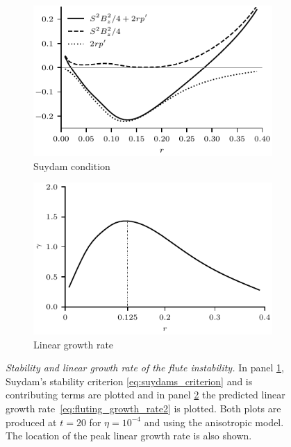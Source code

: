\documentclass[fleqn,usenatbib]{mnras}
\newcommand{\mycaption}[2]{\caption[#1]{\emph{#1} #2}}
\begin{document}
\begin{figure}
  \centering
    \begin{subfigure}{0.49\textwidth}
      \includegraphics[width=\linewidth]{suydam_condition_4.pdf}
      \caption{Suydam condition}
      \label{fig:suydam_condition_4}
    \end{subfigure}
    \hfill
    \begin{subfigure}{0.49\textwidth}
      \includegraphics[width=\linewidth]{growth_rate_4.pdf}
      \caption{Linear growth rate}
      \label{fig:growth_rate_4}
    \end{subfigure}
\mycaption{Stability and linear growth rate of the flute instability.}{In panel
\ref{fig:suydam_condition_4}, Suydam's stability criterion
\eqref{eq:suydams_criterion} and is contributing terms   are plotted and in
panel \ref{fig:growth_rate_4} the predicted linear growth
rate~\eqref{eq:fluting_growth_rate2} is plotted. Both plots are produced at
$t=20$ for $\eta=10^{-4}$ and using the anisotropic model. The location of the
peak linear growth rate is also shown.}
\label{fig:stability_and_growth}%
\end{figure}
\end{document}
